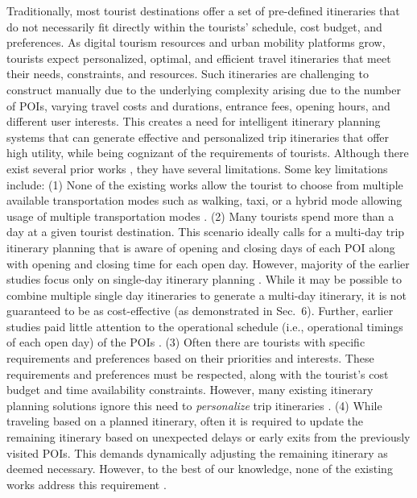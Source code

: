 Traditionally, most tourist destinations offer a set of pre-defined itineraries
that do not necessarily fit directly within the tourists' schedule, cost budget,
and preferences. As digital tourism resources and urban mobility platforms grow,
tourists expect personalized, optimal, and efficient travel itineraries that
meet their needs, constraints, and resources. Such itineraries are challenging
to construct manually due to the underlying complexity arising due to the number
of POIs, varying travel costs and durations, entrance fees, opening hours, and
different user interests. This creates a need for intelligent
itinerary planning systems that can generate effective and personalized trip
itineraries that offer high utility, while being cognizant of the requirements
of tourists. Although there exist several prior works \cite{chen2014automatic,
vanzelst2016itinerary, taylor2018tour, vu2022branch,
panagiotakis2024expectation, liu2024personalized, rambha2024optimized,
lim2018personalized, bolzoni2014efficient}, they have several limitations. Some
key limitations include: (1) None of the existing works allow the tourist to
choose from multiple available transportation modes such as walking, taxi, or a
hybrid mode allowing usage of multiple transportation modes
\cite{chen2014automatic, taylor2018tour, vanzelst2016itinerary}. (2) Many
tourists spend more than a day at a given tourist destination. This scenario
ideally calls for a multi-day trip itinerary planning that is aware of opening
and closing days of each POI along with opening and closing time for each open
day. However, majority of the earlier studies focus only on single-day itinerary
planning \cite{taylor2018tour, vu2022branch, panagiotakis2024expectation}.
While it may be possible to combine multiple single day itineraries to generate
a multi-day itinerary, it is not guaranteed to be as cost-effective (as
demonstrated in Sec.~6). Further, earlier studies paid little attention to the
operational schedule (i.e., operational timings of each open day) of the POIs
\cite{chen2014automatic, vanzelst2016itinerary, taylor2018tour}. (3) Often there
are tourists with specific requirements and preferences based on their
priorities and interests. These requirements and preferences must be respected,
along with the tourist's cost budget and time availability constraints. However,
many existing itinerary planning solutions ignore this need to
\emph{personalize} trip itineraries \cite{rambha2024optimized, yu2017mining,
rani2018development, yu2014optimal}. (4) While traveling based on a planned
itinerary, often it is required to update the remaining itinerary based on
unexpected delays or early exits from the previously visited POIs. This demands
dynamically adjusting the remaining itinerary as deemed necessary. However, to
the best of our knowledge, none of the existing works address this requirement
\cite{chen2014automatic, taylor2018tour, vanzelst2016itinerary}.

